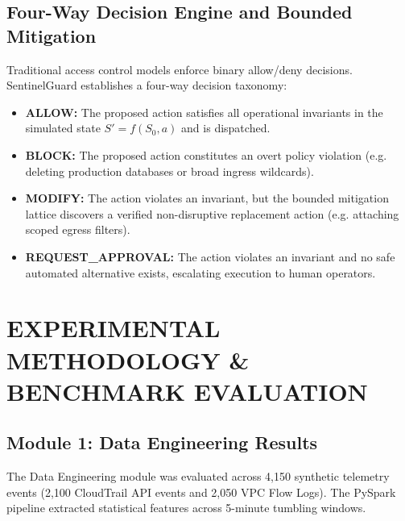 \documentclass[12pt,a4paper]{report}
\begin{document}
\section{Four-Way Decision Engine and Bounded Mitigation}\label{sec:four_way}
Traditional access control models enforce binary allow/deny decisions. SentinelGuard establishes a four-way decision taxonomy:
\begin{itemize}
    \item \textbf{ALLOW:} The proposed action satisfies all operational invariants in the simulated state $S' = f(S_0, a)$ and is dispatched.
    \item \textbf{BLOCK:} The proposed action constitutes an overt policy violation (e.g. deleting production databases or broad ingress wildcards).
    \item \textbf{MODIFY:} The action violates an invariant, but the bounded mitigation lattice discovers a verified non-disruptive replacement action (e.g. attaching scoped egress filters).
    \item \textbf{REQUEST\_APPROVAL:} The action violates an invariant and no safe automated alternative exists, escalating execution to human operators.
\end{itemize}

\chapter{EXPERIMENTAL METHODOLOGY \& BENCHMARK EVALUATION}

\section{Module 1: Data Engineering Results}\label{sec:eval_de}
The Data Engineering module was evaluated across 4,150 synthetic telemetry events (2,100 CloudTrail API events and 2,050 VPC Flow Logs). The PySpark pipeline extracted statistical features across 5-minute tumbling windows.
\end{document}
